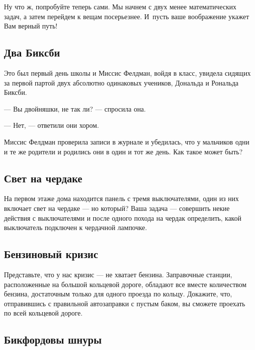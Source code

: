 Ну что ж, попробуйте теперь сами. Мы начнем с двух менее математических задач, а затем перейдем к вещам посерьезнее.
И~пусть ваше воображение укажет Вам верный путь!


\subsection*{Два Биксби} %



Это был первый день школы и Миссис Фелдман, войдя в класс, увидела сидящих за первой партой двух абсолютно одинаковых учеников, Дональда и Рональда Биксби. 


--- Вы двойняшки, не так ли? --- спросила она.

--- Нет, --- ответили они хором.


Миссис Фелдман проверила записи в журнале и убедилась, что у мальчиков одни и те же родители и родились они в один и тот же день. Как такое может быть?




\subsection*{Свет на чердаке}   %



На первом этаже дома находится панель с тремя выключателями, один из них включает свет на чердаке --- но который?  
Ваша задача --- совершить некие действия с выключателями и после одного похода на чердак определить, какой выключатель подключен к чердачной лампочке.


\subsection*{Бензиновый кризис} %



Представьте, что у нас кризис --- не хватает бензина. 
Заправочные станции, расположенные на большой кольцевой дороге, обладают все вместе  количеством бензина, достаточным только для одного проезда по кольцу. Докажите, что, отправившись с правильной автозаправки с пустым баком, вы сможете проехать по всей кольцевой дороге.


\subsection*{Бикфордовы шнуры} %



